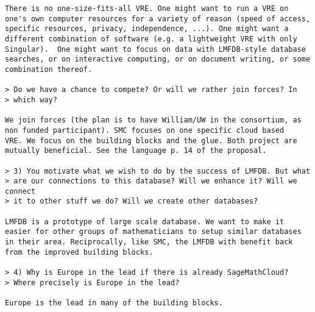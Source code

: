 \begin{draft}
\begin{verbatim}
There is no one-size-fits-all VRE. One might want to run a VRE on
one's own computer resources for a variety of reason (speed of access,
specific resources, privacy, independence, ...). One might want a
different combination of software (e.g. a lightweight VRE with only
Singular).  One might want to focus on data with LMFDB-style database
searches, or on interactive computing, or on document writing, or some
combination thereof.

> Do we have a chance to compete? Or will we rather join forces? In
> which way?

We join forces (the plan is to have William/UW in the consortium, as
non funded participant). SMC focuses on one specific cloud based
VRE. We focus on the building blocks and the glue. Both project are
mutually beneficial. See the language p. 14 of the proposal.

> 3) You motivate what we wish to do by the success of LMFDB. But what
> are our connections to this database? Will we enhance it? Will we connect
> it to other stuff we do? Will we create other databases?

LMFDB is a prototype of large scale database. We want to make it
easier for other groups of mathematicians to setup similar databases
in their area. Reciprocally, like SMC, the LMFDB with benefit back
from the improved building blocks.

> 4) Why is Europe in the lead if there is already SageMathCloud?
> Where precisely is Europe in the lead?

Europe is the lead in many of the building blocks.
\end{verbatim}





\end{draft}

